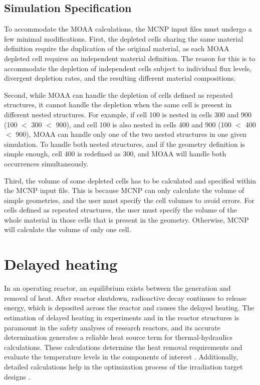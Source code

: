 \subsection{Simulation Specification}

To accommodate the MOAA calculations, the MCNP input files must undergo a few minimal modifications.
First, the depleted cells sharing the same material definition require the duplication of the original material, as each MOAA depleted cell requires an independent material definition.
The reason for this is to accommodate the depletion of independent cells subject to individual flux levels, divergent depletion rates, and the resulting different material compositions.

Second, while MOAA can handle the depletion of cells defined as repeated structures, it cannot handle the depletion when the same cell is present in different nested structures.
For example, if cell 100 is nested in cells 300 and 900 (100 $<$ 300 $<$ 900), and cell 100 is also nested in cells 400 and 900 (100 $<$ 400 $<$ 900), MOAA can handle only one of the two nested structures in one given simulation.
To handle both nested structures, and if the geometry definition is simple enough, cell 400 is redefined as 300, and MOAA will handle both occurrences simultaneously.

Third, the volume of some depleted cells has to be calculated and specified within the MCNP input file.
This is because MCNP can only calculate the volume of simple geometries, and the user must specify the cell volumes to avoid errors.
For cells defined as repeated structures, the user must specify the volume of the whole material in those cells that is present in the geometry.
Otherwise, MCNP will calculate the volume of only one cell.


\section{Delayed heating}

In an operating reactor, an equilibrium exists between the generation and removal of heat.
After reactor shutdown, radioactive decay continues to release energy, which is deposited across the reactor and causes the delayed heating.
The estimation of delayed heating in experiments and in the reactor structures is paramount in the safety analyses of research reactors, and its accurate determination generates a reliable heat source term for thermal-hydraulics calculations.
These calculations determine the heat removal requirements and evaluate the temperature levels in the components of interest \cite{fairhurst_decay_2022, fairhurst_machine_2022, fairhurst_machine_2_2022}.
Additionally, detailed calculations help in the optimization process of the irradiation target designs \cite{peterson-droogh_current_2018}.

